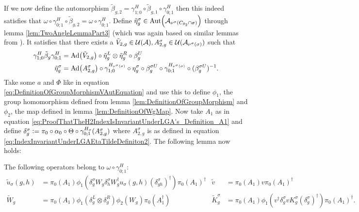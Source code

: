 \documentclass[11pt,a4paper,twoside]{article}
\numberwithin{equation}{section}
\begin{document}
	If we now define the automorphism $\tilde{\beta}_{g,2}=\gamma^{H}_{1;0}\circ\tilde\beta_{g,1}\circ\gamma^{H}_{0;1}$ then this indeed satisfies that $\omega\circ\gamma^{H}_{0;1}\circ\tilde{\beta}_{g,2}=\omega\circ\gamma^{H}_{0;1}$. Define $\tilde\eta_g^\sigma\in\Aut{\AA_{\nu^{\sigma}(C_{\theta_2}\cap\sigma)}}$ through lemma \ref{lem:TwoAngleLemmaPart3} (which was again based on similar lemmas from \cite{ogata2021h3gmathbb}). It satisfies that there exists a $\tilde V_{2,g}\in\mathcal U(\mathcal A),A_{2,g}^{\sigma}\in\mathcal U(\mathcal A_{\nu^\sigma(\sigma)})$ such that
	\begin{align}
		\label{eq:IndexInvariantUnderLGAEtaTildeDefiniton1}
		\gamma^{H}_{1;0}\tilde{\beta}_g\gamma^{H}_{0;1}&=\Ad{\tilde V_{2,g}}\circ\tilde{\eta}_g^L\otimes\tilde{\eta}_g^R\circ\beta_g^U\\
		\label{eq:IndexInvariantUnderLGAEtaTildeDefiniton2}
		\tilde{\eta}_g^\sigma&=\Ad{A_{2,g}^\sigma}\circ\gamma^{H_{\nu^{\sigma}(\sigma)}}_{1;0}\circ\eta_g^\sigma\circ\beta_g^{\sigma U}\circ\gamma^{H_{\nu^{\sigma}(\sigma)}}_{0;1}\circ(\beta_g^{\sigma U})^{-1}.
	\end{align}
	Take some $a$ and $\Phi$ like in equation \eqref{eq:DefinitionOfGroupMorphismVAutEquation} and use this to define $\phi_1$, the group homomorphism defined from lemma \ref{lem:DefinitionOfGroupMorphism} and $\phi_2$, the map defined in lemma \ref{lem:DefinitionOfWgMap}. Now take $A_1$ as in equation \eqref{eq:ProofThatTheH2IndexIsInvariantUnderLGA's_Definition_A1} and define $\delta_g^\sigma\vcentcolon= \pi_0\circ\alpha_0\circ\Theta\circ\gamma^{H_\sigma}_{0;1}(A^\sigma_{2,g})$ where $A^\sigma_{2,g}$ is as defined in equation \eqref{eq:IndexInvariantUnderLGAEtaTildeDefiniton2}. The following lemma now holds:
	\begin{lemma}\label{lem:OperatorsBelongingToOmegaAfterH}
		The following operators belong to $\omega\circ\gamma^{H}_{0;1}:$
		\begin{align}
			\tilde u_\sigma(g,h)&=\pi_0(A_1) \phi_1\left(\delta^\sigma_g W_g\delta^\sigma_h W_g^\dagger u_\sigma(g,h)(\delta^\sigma_{gh})^\dagger\right)\pi_0(A_1)^\dagger&\tilde{v}&=\pi_0(A_1)v\pi_0(A_1)^\dagger\\
			\tilde{W}_g&=\pi_0(A_1)\phi_1(\delta^L_g\otimes\delta^R_g)\phi_2( W_g)\pi_0(A_1^\dagger)&\tilde{K}_g^\sigma&=\pi_0(A_1)\phi_1(v^\dagger \delta_g^\sigma v K_g^\sigma (\delta_g^\sigma)^\dagger) \pi_0(A_1)^\dagger.
		\end{align}
	\end{lemma}
\end{document}
